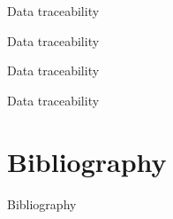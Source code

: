 \documentclass[xcolor=dvipsnames,11pt]{beamer}
\begin{document}
\begin{frame}[fragile]{Data traceability}{}

\end{frame}

\begin{frame}[fragile]{Data traceability}{}

\end{frame}

\begin{frame}[fragile]{Data traceability}{}

\end{frame}

\begin{frame}[fragile]{Data traceability}{}

\end{frame}

\nocite{Prokscha2011,McFadden2007,Rondel2000}
\section{Bibliography}
\begin{frame}[allowframebreaks]{Bibliography}{}
	
	
\end{frame}

{\1
\begin{frame}
\end{frame}}







		
\end{document}

